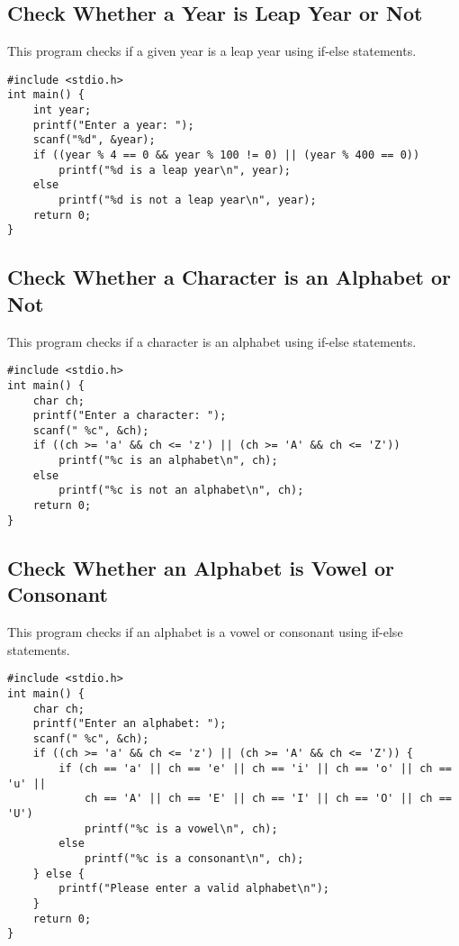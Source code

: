 \documentclass[a4paper,12pt]{article}
\begin{document}
\newpage

\subsection{Check Whether a Year is Leap Year or Not}
This program checks if a given year is a leap year using if-else statements.

\begin{lstlisting}[caption={Check Whether a Year is Leap Year or Not}]
#include <stdio.h>
int main() {
    int year;
    printf("Enter a year: ");
    scanf("%d", &year);
    if ((year % 4 == 0 && year % 100 != 0) || (year % 400 == 0))
        printf("%d is a leap year\n", year);
    else
        printf("%d is not a leap year\n", year);
    return 0;
}
\end{lstlisting}

\newpage

\subsection{Check Whether a Character is an Alphabet or Not}
This program checks if a character is an alphabet using if-else statements.

\begin{lstlisting}[caption={Check Whether a Character is an Alphabet or Not}]
#include <stdio.h>
int main() {
    char ch;
    printf("Enter a character: ");
    scanf(" %c", &ch);
    if ((ch >= 'a' && ch <= 'z') || (ch >= 'A' && ch <= 'Z'))
        printf("%c is an alphabet\n", ch);
    else
        printf("%c is not an alphabet\n", ch);
    return 0;
}
\end{lstlisting}

\newpage

\subsection{Check Whether an Alphabet is Vowel or Consonant}
This program checks if an alphabet is a vowel or consonant using if-else statements.

\begin{lstlisting}[caption={Check Whether an Alphabet is Vowel or Consonant}]
#include <stdio.h>
int main() {
    char ch;
    printf("Enter an alphabet: ");
    scanf(" %c", &ch);
    if ((ch >= 'a' && ch <= 'z') || (ch >= 'A' && ch <= 'Z')) {
        if (ch == 'a' || ch == 'e' || ch == 'i' || ch == 'o' || ch == 'u' ||
            ch == 'A' || ch == 'E' || ch == 'I' || ch == 'O' || ch == 'U')
            printf("%c is a vowel\n", ch);
        else
            printf("%c is a consonant\n", ch);
    } else {
        printf("Please enter a valid alphabet\n");
    }
    return 0;
}
\end{lstlisting}
\end{document}
